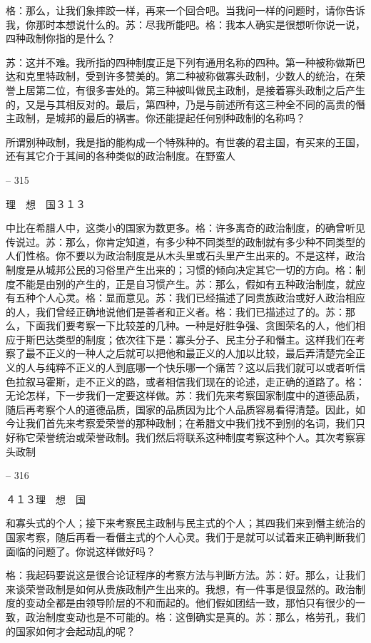\documentclass[11pt,oneside]{book}
\begin{document}
\begin{common-format}
    格：那么，让我们象摔跤一样，再来一个回合吧。当我问一样的问题时，请你告诉我，你那时本想说什么的。苏：尽我所能吧。格：我本人确实是很想听你说一说，四种政制你指的是什么？

    苏：这并不难。我所指的四种制度正是下列有通用名称的四种。第一种被称做斯巴达和克里特政制，受到许多赞美的。第二种被称做寡头政制，少数人的统治，在荣誉上居第二位，有很多害处的。第三种被叫做民主政制，是接着寡头政制之后产生的，又是与其相反对的。最后，第四种，乃是与前述所有这三种全不同的高贵的僭主政制，是城邦的最后的祸害。你还能提起任何别种政制的名称吗？

    所谓别种政制，我是指的能构成一个特殊种的。有世袭的君主国，有买来的王国，还有其它介于其间的各种类似的政治制度。在野蛮人

    

-- 315

    理　想　国３１３

    中比在希腊人中，这类小的国家为数更多。格：许多离奇的政治制度，的确曾听见传说过。苏：那么，你肯定知道，有多少种不同类型的政制就有多少种不同类型的人们性格。你不要以为政治制度是从木头里或石头里产生出来的。不是这样，政治制度是从城邦公民的习俗里产生出来的；习惯的倾向决定其它一切的方向。格：制度不能是由别的产生的，正是自习惯产生。苏：那么，假如有五种政治制度，就应有五种个人心灵。格：显而意见。苏：我们已经描述了同贵族政治或好人政治相应的人，我们曾经正确地说他们是善者和正义者。格：我们已描述过了的。苏：那么，下面我们要考察一下比较差的几种。一种是好胜争强、贪图荣名的人，他们相应于斯巴达类型的制度；依次往下是：寡头分子、民主分子和僭主。这样我们在考察了最不正义的一种人之后就可以把他和最正义的人加以比较，最后弄清楚完全正义的人与纯粹不正义的人到底哪一个快乐哪一个痛苦？这以后我们就可以或者听信色拉叙马霍斯，走不正义的路，或者相信我们现在的论述，走正确的道路了。格：无论怎样，下一步我们一定要这样做。苏：我们先来考察国家制度中的道德品质，随后再考察个人的道德品质，国家的品质因为比个人品质容易看得清楚。因此，如今让我们首先来考察爱荣誉的那种政制；在希腊文中我们找不到别的名词，我们只好称它荣誉统治或荣誉政制。我们然后将联系这种制度考察这种个人。其次考察寡头政制

    

-- 316

    ４１３理　想　国

    和寡头式的个人；接下来考察民主政制与民主式的个人；其四我们来到僭主统治的国家考察，随后再看一看僭主式的个人心灵。我们于是就可以试着来正确判断我们面临的问题了。你说这样做好吗？

    格：我起码要说这是很合论证程序的考察方法与判断方法。苏：好。那么，让我们来谈荣誉政制是如何从贵族政制产生出来的。我想，有一件事是很显然的。政治制度的变动全都是由领导阶层的不和而起的。他们假如团结一致，那怕只有很少的一致，政治制度变动也是不可能的。格：这倒确实是真的。苏：那么，格劳孔，我们的国家如何才会起动乱的呢？


\end{common-format}
\end{document}
